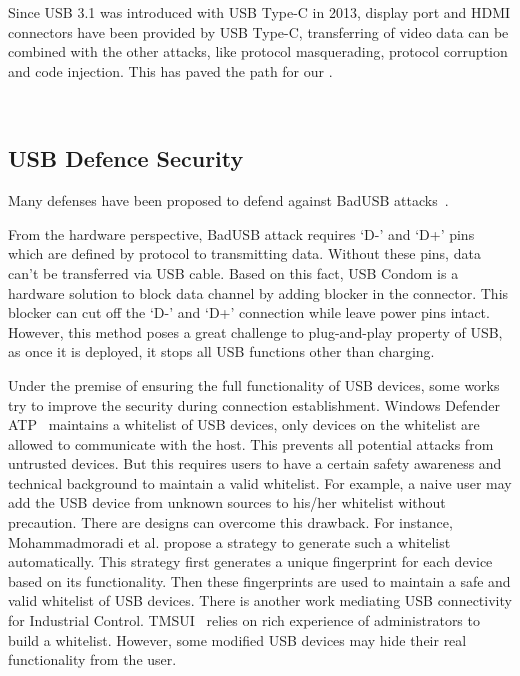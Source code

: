 Since USB 3.1 was introduced with USB Type-C in 2013, display port and HDMI
connectors have been provided by USB Type-C, transferring of video data can be
combined with the other attacks, like protocol masquerading,  protocol
corruption and code injection. This has paved the path for our \tool.




\\


\subsection{USB Defence Security}
\label{subsec:usb_defence}
Many defenses have been proposed to defend against BadUSB attacks~\cite{sok}.

From the hardware perspective, BadUSB attack requires `D-' and `D+' pins which
are defined by protocol to transmitting data.  Without these pins, data can't
 be transferred via USB cable. Based
on this fact, USB Condom \cite{Condom} is a hardware solution to block data
channel by adding blocker in the connector. This blocker can cut off the `D-'
and `D+' connection while leave power pins intact.  However, this method poses
a great challenge to plug-and-play property of USB, as once it is deployed, it
stops all USB functions other than charging.

Under the premise of ensuring the full functionality of USB devices, some works
try to improve the security during connection establishment.  Windows Defender
ATP~\cite{windenfenderwhite} maintains a whitelist of USB devices, only devices
on the whitelist are allowed to communicate with the host. This prevents all
potential attacks from untrusted devices. But this requires users to have a
certain safety awareness and technical background to maintain a valid
whitelist. For example, a naive user may add the USB device from unknown
sources to his/her whitelist without precaution. There are designs can overcome
this drawback. For instance, Mohammadmoradi et
al.\cite{mohammadmoradi2018making} propose a strategy to generate such a
whitelist automatically. This strategy first generates a unique fingerprint for
each device based on its functionality. Then these fingerprints are used to
maintain a safe and valid whitelist of USB devices. There is another work
mediating USB connectivity for Industrial Control. TMSUI~\cite{yang2015tmsui}
relies on rich experience of administrators to build a whitelist. However, some
modified USB devices may hide their real functionality from the user.

